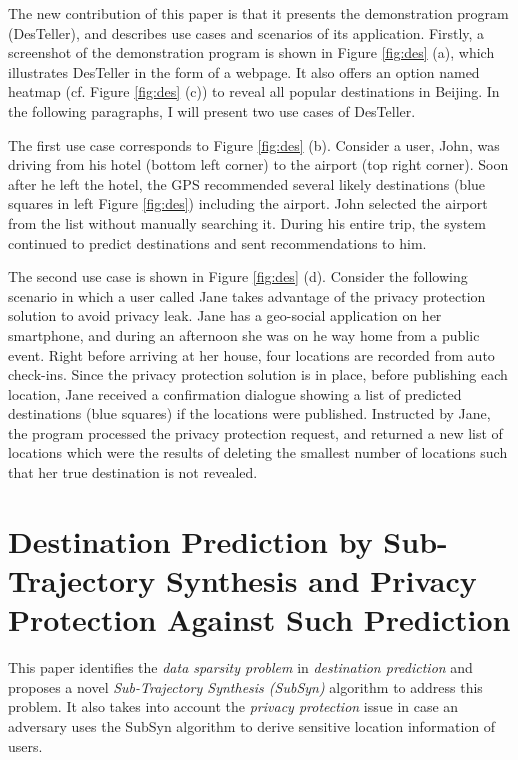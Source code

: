 \documentclass[paper=a4, fontsize=18pt]{article} %
\numberwithin{equation}{section} %
\numberwithin{figure}{section} %
\numberwithin{table}{section} %
\begin{document}
The new contribution of this paper is that it presents the demonstration program (DesTeller), and describes use cases and scenarios of its application. Firstly, a screenshot of the demonstration program is shown in Figure \ref{fig:des} (a), which illustrates DesTeller in the form of a webpage. It also offers an option named heatmap (cf. Figure \ref{fig:des} (c)) to reveal all popular destinations in Beijing. In the following paragraphs, I will present two use cases of DesTeller.

The first use case corresponds to Figure \ref{fig:des} (b). Consider a user, John, was driving from his hotel (bottom left corner) to the airport (top right corner). Soon after he left the hotel, the GPS recommended several likely destinations (blue squares in left Figure \ref{fig:des}) including the airport. John selected the airport from the list without manually searching it. During his entire trip, the system continued to predict destinations and sent recommendations to him.

The second use case is shown in Figure \ref{fig:des} (d). Consider the following scenario in which a user called Jane takes advantage of the privacy protection solution to avoid privacy leak. Jane has a geo-social application on her smartphone, and during an afternoon she was on he way home from a public event. Right before arriving at her house, four locations are recorded from auto check-ins. Since the privacy protection solution is in place, before publishing each location, Jane received a confirmation dialogue showing a list of predicted destinations (blue squares) if the locations were published. Instructed by Jane, the program processed the privacy protection request, and returned a new list of locations which were the results of deleting the smallest number of locations such that her true destination is not revealed.

\section{Destination Prediction by Sub-Trajectory Synthesis and Privacy Protection Against Such Prediction \cite{XZZXHX13}}

This paper identifies the \emph{data sparsity problem} in \emph{destination prediction} and proposes a novel \emph{Sub-Trajectory Synthesis (SubSyn)} algorithm to address this problem. It also takes into account the \emph{privacy protection} issue in case an adversary uses the SubSyn algorithm to derive sensitive location information of users.
\end{document}
